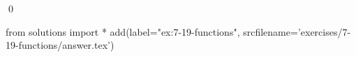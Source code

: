 
\begin{ex}
  \label{ex:7-19-functions}
  
  \qed
\end{ex}
\begin{python0}
from solutions import *
add(label="ex:7-19-functions",
    srcfilename='exercises/7-19-functions/answer.tex')
\end{python0}
